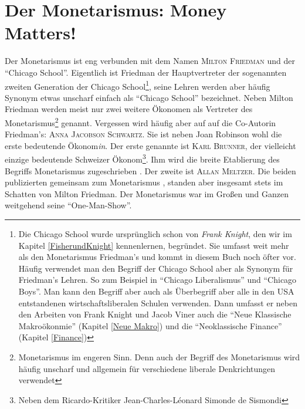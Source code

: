 %
%
%

\chapter{Der Monetarismus: Money Matters!}
\label{Monetarismus}

Der Monetarismus ist eng verbunden mit dem Namen \textsc{Milton Friedman} und der "`Chicago School"'. Eigentlich ist Friedman der Hauptvertreter der sogenannten zweiten Generation der Chicago School\footnote{Die Chicago School wurde ursprünglich schon von \textit{Frank Knight}, den wir im Kapitel \ref{FisherundKnight} kennenlernen, begründet. Sie umfasst weit mehr als den Monetarismus Friedman's und kommt in diesem Buch noch öfter vor. Häufig verwendet man den Begriff der Chicago School aber als Synonym für Friedman's Lehren. So zum Beispiel in "`Chicago Liberalismus"' und "`Chicago Boys"'. Man kann den Begriff aber auch als Überbegriff aber alle in den USA entstandenen wirtschaftsliberalen Schulen verwenden. Dann umfasst er neben den Arbeiten von Frank Knight und Jacob Viner auch die "`Neue Klassische Makroökonmie"' (Kapitel \ref{Neue Makro}) und die "`Neoklassische Finance"' (Kapitel \ref{Finance})}, seine Lehren werden aber häufig Synonym etwas unscharf einfach als "`Chicago School"' bezeichnet. Neben Milton Friedman werden meist nur zwei weitere Ökonomen als Vertreter des Monetarismus\footnote{Monetarismus im engeren Sinn. Denn auch der Begriff des Monetarismus wird häufig unscharf und allgemein für verschiedene liberale Denkrichtungen verwendet} genannt. Vergessen wird häufig aber auf auf die Co-Autorin Friedman's: \textsc{Anna Jacobson Schwartz}. Sie ist neben Joan Robinson wohl die erste bedeutende Ökonom\textit{in}. Der erste genannte ist \textsc{Karl Brunner}, der vielleicht einzige bedeutende Schweizer Ökonom\footnote{Neben dem Ricardo-Kritiker Jean-Charles-Léonard Simonde de Sismondi}. Ihm wird die breite Etablierung des Begriffs Monetarismus zugeschrieben \parencite{Pierenkemper2012, Brunner1968}. Der zweite ist \textsc{Allan Meltzer}. Die beiden publizierten gemeinsam zum Monetarismus \parencite{Meltzer1971}, standen aber insgesamt stets im Schatten von Milton Friedman. Der Monetarismus war im Großen und Ganzen weitgehend seine "`One-Man-Show"'. 

